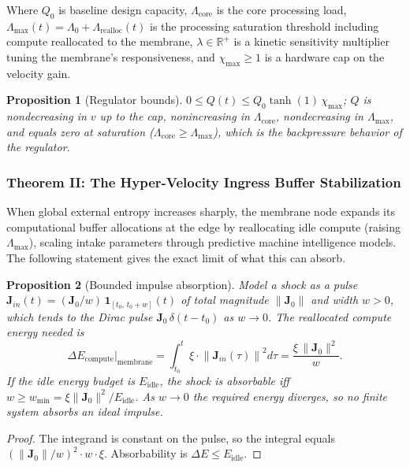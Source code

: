 \documentclass[11pt,a4paper]{article}
\theoremstyle{definition}
\theoremstyle{plain}
\newtheorem{proposition}{Proposition}
\theoremstyle{remark}
\newcommand{\R}{\mathbb{R}}
\begin{document}
Where $Q_0$ is baseline design capacity, $\Lambda_{\mathrm{core}}$ is the core processing load, $\Lambda_{\max}(t) = \Lambda_0 + \Lambda_{\mathrm{realloc}}(t)$ is the processing saturation threshold including compute reallocated to the membrane, $\lambda \in \R^{+}$ is a kinetic sensitivity multiplier tuning the membrane's responsiveness, and $\chi_{\max} \ge 1$ is a hardware cap on the velocity gain.

\begin{proposition}[Regulator bounds]\label{prop:Q}
$0 \le Q(t) \le Q_0 \tanh(1)\,\chi_{\max}$; $Q$ is nondecreasing in $v$ up to the cap, nonincreasing in $\Lambda_{\mathrm{core}}$, nondecreasing in $\Lambda_{\max}$, and equals zero at saturation ($\Lambda_{\mathrm{core}} \ge \Lambda_{\max}$), which is the backpressure behavior of the regulator.
\end{proposition}

\subsubsection*{Theorem II: The Hyper-Velocity Ingress Buffer Stabilization}
When global external entropy increases sharply, the membrane node expands its computational buffer allocations at the edge by reallocating idle compute (raising $\Lambda_{\max}$), scaling intake parameters through predictive machine intelligence models. The following statement gives the exact limit of what this can absorb.

\begin{proposition}[Bounded impulse absorption]\label{prop:impulse}
Model a shock as a pulse $\mathbf J_{in}(t) = (\mathbf J_0 / w)\,\mathbf 1_{[t_0,\,t_0 + w]}(t)$ of total magnitude $\|\mathbf J_0\|$ and width $w > 0$, which tends to the Dirac pulse $\mathbf J_0\,\delta(t - t_0)$ as $w \to 0$. The reallocated compute energy needed is
\begin{equation}
\Delta E_{\mathrm{compute}}\Big|_{\mathrm{membrane}}
= \int_{t_0}^{t} \xi \cdot \left\| \mathbf J_{in}(\tau) \right\|^{2} d\tau
= \frac{\xi\, \|\mathbf J_0\|^{2}}{w}.
\end{equation}
If the idle energy budget is $E_{\mathrm{idle}}$, the shock is absorbable iff $w \ge w_{\min} = \xi \|\mathbf J_0\|^{2} / E_{\mathrm{idle}}$. As $w \to 0$ the required energy diverges, so no finite system absorbs an ideal impulse.
\end{proposition}
\begin{proof}
The integrand is constant on the pulse, so the integral equals $(\|\mathbf J_0\|/w)^2 \cdot w \cdot \xi$. Absorbability is $\Delta E \le E_{\mathrm{idle}}$. \qedhere
\end{proof}
\end{document}
